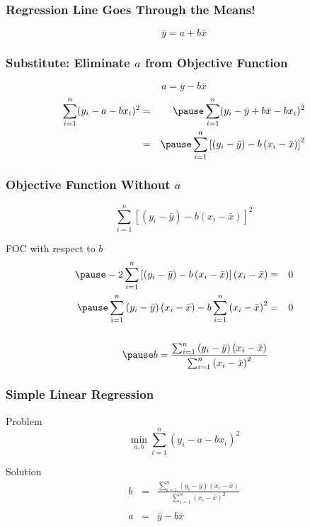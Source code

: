 \documentclass[handout]{beamer}
\begin{document}
\begin{frame}

\frametitle{Regression Line Goes Through the Means!}
 \Huge
\begin{equation*}\boxed{\bar{y} = a + b\bar{x}}\end{equation*}
\normalsize
\end{frame}
\begin{frame}
\frametitle{Substitute: Eliminate $a$ from Objective Function}
\begin{equation*}\boxed{a = \bar{y} - b\bar{x}}\end{equation*}
\begin{eqnarray*}
	\sum_{i=1}^n (y_i - a - b x_i)^2 &=& \pause\sum_{i=1}^n (y_i - \bar{y} + b\bar{x} - b x_i)^2\\
	&=&\pause\sum_{i=1}^n \left[ \left(y_i - \bar{y}\right) - b\left(x_i - \bar{x}\right) \right]^2
\end{eqnarray*}
\end{frame}
\begin{frame}
\frametitle{Objective Function Without $a$}
$$\boxed{\sum_{i=1}^n \left[ (y_i - \bar{y}) - b(x_i - \bar{x}) \right]^2}$$
\begin{block}{FOC with respect to $b$}
\begin{eqnarray*}\pause
	-2\sum_{i=1}^n \left[\left(y_i - \bar{y}\right) - b\left(x_i - \bar{x}\right) \right]\left(x_i - \bar{x} \right) &=& 0\\\pause
	\sum_{i=1}^n \left(y_i - \bar{y}\right)\left(x_i - \bar{x} \right) - b\sum_{i=1}^n \left(x_i - \bar{x}\right)^2 &=& 0\\ \\\pause
	b = \frac{\sum_{i=1}^n \left(y_i - \bar{y}\right)\left(x_i - \bar{x} \right)}{\sum_{i=1}^n \left(x_i - \bar{x}\right)^2}
\end{eqnarray*}
\end{block}
\end{frame}
\begin{frame}
\frametitle{Simple Linear Regression}
	\begin{block}{Problem}
	$$\min_{a,b}  \sum_{i=1}^n (y_i - a - b x_i)^2$$
\end{block}
\begin{block}{Solution}
	\begin{eqnarray*}
		b &=& \frac{\sum_{i=1}^n \left(y_i - \bar{y}\right)\left(x_i - \bar{x} \right)}{\sum_{i=1}^n \left(x_i - \bar{x}\right)^2}\\ \\
		a &=& \bar{y} - b\bar{x}
	\end{eqnarray*}
\end{block}
\end{frame}
\end{document}
